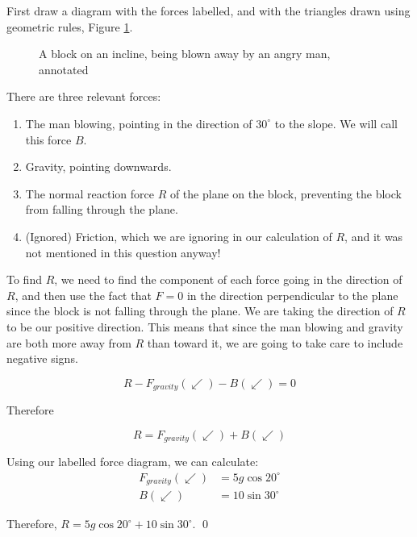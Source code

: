 \begin{solution}
    First draw a diagram with the forces labelled, and with the triangles drawn using geometric rules, Figure \ref{fig:block-on-plane-man-annotated}.

        \begin{figure}[H]
        \centering
        \caption{A block on an incline, being blown away by an angry man, annotated}
        \label{fig:block-on-plane-man-annotated}
    \end{figure}
    There are three relevant forces:
    \begin{enumerate}
        \item The man blowing, pointing in the direction of $30^\circ$ to the slope. We will call this force $B$.
        \item Gravity, pointing downwards.
        \item The normal reaction force $R$ of the plane on the block, preventing the block from falling through the plane.
        \item (Ignored) Friction, which we are ignoring in our calculation of $R$, and it was not mentioned in this question anyway!
    \end{enumerate}

    To find $R$, we need to find the component of each force going in the direction of $R$, and then use the fact that $F=0$ in the direction perpendicular to the plane since 
    the block is not falling through the plane. We are taking the direction of $R$ to be our positive direction. 
    This means that since the man blowing and gravity are both more away from $R$ than toward it, we are going to take care to include negative signs.

    \[ R -F_{gravity}(\swarrow) - B(\swarrow) = 0\]

    Therefore 

    \[ R = F_{gravity}(\swarrow) + B(\swarrow) \]

    Using our labelled force diagram, we can calculate:
    \begin{align*}
    F_{gravity}(\swarrow) &=  5g \cos 20^\circ \\
    B(\swarrow) &= 10 \sin 30^\circ 
    \end{align*}

    Therefore, $R = 5g \cos 20^\circ + 10 \sin 30^\circ $.
    \qed
\end{solution}

